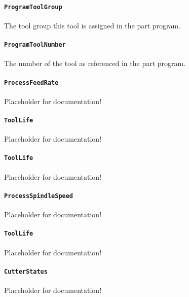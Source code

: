 \paragraph{\texttt{ProgramToolGroup}}\mbox{}
\newline\tab The tool group this tool is assigned in the part program.

\paragraph{\texttt{ProgramToolNumber}}\mbox{}
\newline\tab The number of the tool as referenced in the part program.

\paragraph{\texttt{ProcessFeedRate}}\mbox{}
\newline\tab Placeholder for documentation!

\paragraph{\texttt{ToolLife}}\mbox{}
\newline\tab Placeholder for documentation!

\paragraph{\texttt{ToolLife}}\mbox{}
\newline\tab Placeholder for documentation!

\paragraph{\texttt{ProcessSpindleSpeed}}\mbox{}
\newline\tab Placeholder for documentation!

\paragraph{\texttt{ToolLife}}\mbox{}
\newline\tab Placeholder for documentation!

\paragraph{\texttt{CutterStatus}}\mbox{}
\newline\tab Placeholder for documentation!

